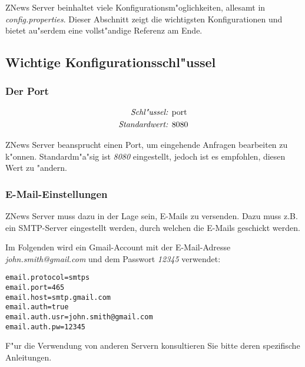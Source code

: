 ZNews Server beinhaltet viele Konfigurationsm"oglichkeiten,
allesamt in \emph{config.properties}.
Dieser Abschnitt zeigt die wichtigsten Konfigurationen
und bietet au"serdem eine vollst"andige Referenz am Ende.

\subsection{Wichtige Konfigurationsschl"ussel}

\subsubsection{Der Port} \label{sec:config:port}

\begin{align*}
    \emph{Schl"ussel: } & \lstinline{port}\\
    \emph{Standardwert: } & \lstinline{8080}
\end{align*}

ZNews Server beansprucht einen Port, um eingehende
Anfragen bearbeiten zu k"onnen. Standardm"a"sig ist
\emph{8080} eingestellt, jedoch ist es empfohlen,
diesen Wert zu "andern.

\subsubsection{E-Mail-Einstellungen}

ZNews Server muss dazu in der Lage sein, E-Mails
zu versenden. Dazu muss z.B. ein SMTP-Server eingestellt
werden, durch welchen die E-Mails geschickt werden.

Im Folgenden wird ein Gmail-Account mit der
E-Mail-Adresse \emph{john.smith@gmail.com} und
dem Passwort \emph{12345} verwendet:

\begin{lstlisting}[]%@formatter:off
email.protocol=smtps
email.port=465
email.host=smtp.gmail.com
email.auth=true
email.auth.usr=john.smith@gmail.com
email.auth.pw=12345
\end{lstlisting}%

F"ur die Verwendung von anderen Servern konsultieren Sie
bitte deren spezifische Anleitungen.

